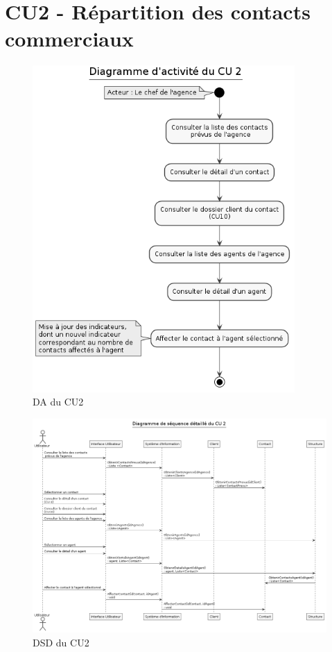 \clearpage
\section{CU2 - Répartition des contacts commerciaux}

\begin{figure}[H]
\centering
\includegraphics[width=10cm]{figures/DA_CU2.png}
\caption{DA du CU2}
\end{figure}

\begin{figure}[H]
\centering
\includegraphics[width=\textwidth]{figures/DSD_CU2.png}
\caption{DSD du CU2}
\end{figure}

